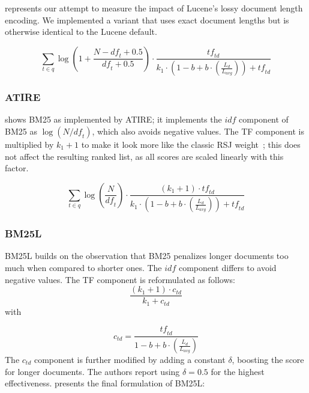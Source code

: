  represents our attempt to measure the impact of Lucene’s lossy document length encoding. We implemented a variant that uses exact document lengths but is otherwise identical to the Lucene default.

\begin{equation}
	\label{lucene-accurate}
	\sum_{t\in q}\log\left(1 + \frac{N-\mathit{df}_t+0.5}{\mathit{df}_t+0.5}\right)\cdot\frac{\mathit{tf}_{\mathit{td}}}{k_1\cdot \left(1-b+b\cdot\left(\frac{L_d}{L_{\mathit{avg}}}\right)\right)+\mathit{tf}_{\mathit{td}}}
\end{equation}

\subsubsection{ATIRE~\citep{ATIRE}}
 shows BM25 as implemented by ATIRE; it implements the $\mathit{idf}$ component of BM25 as $\log(N/\mathit{df}_{t})$, which also avoids negative values. The TF component is multiplied by $k_1+1$ to make it look more like the classic RSJ weight~\citep{RSJ}; this does not affect the resulting ranked list, as all scores are scaled linearly with this factor.

\begin{equation}
	\label{atire-variant}
	\sum_{t\in q}\log\left(\frac{N}{\mathit{df}_t}\right)\cdot\frac{\left(k_1 + 1\right)\cdot \mathit{tf}_{\mathit{td}}}{k_1\cdot\left(1-b+b\cdot\left(\frac{L_{d}}{L_{\mathit{avg}}}\right)\right)+\mathit{tf}_{\mathit{td}}}
\end{equation}

\subsubsection{BM25L~\citep{bm25l}}
BM25L builds on the observation that BM25 penalizes longer documents too much when compared to shorter ones. The $\mathit{idf}$ component differs to avoid negative values. The TF component is reformulated as follows:
\begin{equation}
	\frac{\left(k_1+1\right)\cdot c_{\mathit{td}}}{k_1+c_{\mathit{td}}}  
\end{equation}
with 

\begin{equation}
	c_{\mathit{td}} = \frac{\mathit{tf}_{\mathit{td}}}{1 - b + b \cdot \left(\frac{L_d}{L_{\mathit{avg}}}\right)}  
\end{equation}
The $c_{td}$ component is further modified by adding a constant $\delta$, boosting the score for longer documents. The authors report using $\delta = 0.5$ for the highest effectiveness.  presents the final formulation of BM25L:


